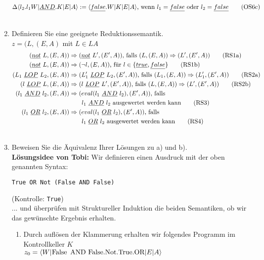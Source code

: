 \documentclass[ngerman,a4paper]{report}
\begin{document}
\begin{enumerate}
\begin{align}
\Delta\langle l_2.l_1W|\underline{AND}.K|E|A\rangle &:= \langle \underline{false}.W|K|E|A\rangle\text{, wenn }l_1=\underline{false}\text{ oder }l_2=\underline{false}\tag{OS6c}\\\notag
\end{align}
\item Definieren Sie eine geeignete Reduktionssemantik.\\
$z=(L, (E,A)$ mit $L \in LA$
\begin{align}
(\underline{not}\  L,(E,A)) &\Rightarrow (\underline{not}\  L',(E',A))\text{, falls }(L,(E,A)) \Rightarrow (L',(E',A))\tag{RS1a}\\
(\underline{not}\  L,(E,A)) &\Rightarrow (\neg l,(E,A))\text{, für }l\in\{\underline{true},\underline{false}\}\tag{RS1b}\\
(L_1\ \underline{LOP}\ L_2,(E,A)) &\Rightarrow (L_1'\ \underline{LOP}\ L_2,(E',A))\text{, falls }(L_1,(E,A)) \Rightarrow (L_1',(E',A))\tag{RS2a}\\
(l\ \underline{LOP}\ L,(E,A)) &\Rightarrow (l\ \underline{LOP}\ L',(E',A))\text{, falls }(L,(E,A)) \Rightarrow (L',(E',A))\tag{RS2b}\\
(l_1\ \underline{AND}\ l_2,(E,A)) &\Rightarrow (eval(l_1\ \underline{AND}\ l_2),(E',A))\text{, falls }\notag\\&\quad\quad l_1\ \underline{AND}\ l_2\text{ ausgewertet werden kann}\tag{RS3}\\
(l_1\ \underline{OR}\ l_2,(E,A)) &\Rightarrow (eval(l_1\ \underline{OR}\ l_2),(E',A))\text{, falls }\notag\\&\quad\quad l_1\ \underline{OR}\ l_2\text{ ausgewertet werden kann}\tag{RS4}\\ \notag
\end{align}
\item Beweisen Sie die Äquivalenz Ihrer Lösungen zu a) und b).\\
\textbf{Lösungsidee von Tobi:}
Wir definieren einen Ausdruck mit der oben genannten Syntax:
\begin{lstlisting}
True OR Not (False AND False)
\end{lstlisting}
(Kontrolle: \lstinline!True!)\\
... und überprüfen mit Struktureller Induktion die beiden Semantiken, ob wir das gewünschte Ergebnis erhalten.
\begin{enumerate}
\item Durch auflösen der Klammerung erhalten wir folgendes Programm im Kontrollkeller $K$\\
$z_0=\langle W|\text{\lstinline!False AND False.Not.True.OR!}|E|A\rangle$

\end{enumerate}
\end{enumerate}
\end{document}
